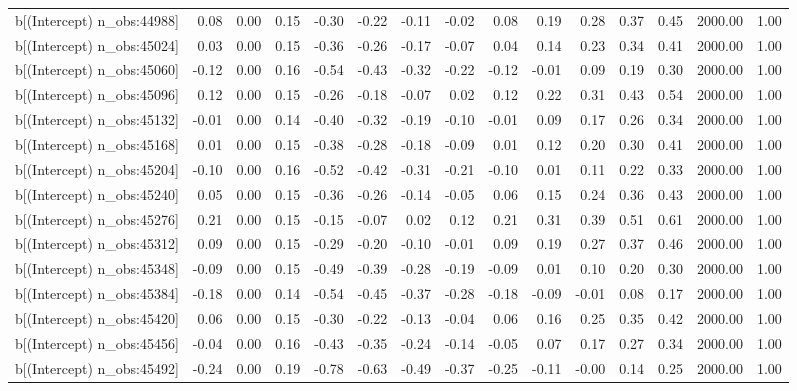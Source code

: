 \begin{table}[ht]
\begin{tabular}{rrrrrrrrrrrrrrr}
  b[(Intercept) n\_obs:44988] & 0.08 & 0.00 & 0.15 & -0.30 & -0.22 & -0.11 & -0.02 & 0.08 & 0.19 & 0.28 & 0.37 & 0.45 & 2000.00 & 1.00 \\ 
  b[(Intercept) n\_obs:45024] & 0.03 & 0.00 & 0.15 & -0.36 & -0.26 & -0.17 & -0.07 & 0.04 & 0.14 & 0.23 & 0.34 & 0.41 & 2000.00 & 1.00 \\ 
  b[(Intercept) n\_obs:45060] & -0.12 & 0.00 & 0.16 & -0.54 & -0.43 & -0.32 & -0.22 & -0.12 & -0.01 & 0.09 & 0.19 & 0.30 & 2000.00 & 1.00 \\ 
  b[(Intercept) n\_obs:45096] & 0.12 & 0.00 & 0.15 & -0.26 & -0.18 & -0.07 & 0.02 & 0.12 & 0.22 & 0.31 & 0.43 & 0.54 & 2000.00 & 1.00 \\ 
  b[(Intercept) n\_obs:45132] & -0.01 & 0.00 & 0.14 & -0.40 & -0.32 & -0.19 & -0.10 & -0.01 & 0.09 & 0.17 & 0.26 & 0.34 & 2000.00 & 1.00 \\ 
  b[(Intercept) n\_obs:45168] & 0.01 & 0.00 & 0.15 & -0.38 & -0.28 & -0.18 & -0.09 & 0.01 & 0.12 & 0.20 & 0.30 & 0.41 & 2000.00 & 1.00 \\ 
  b[(Intercept) n\_obs:45204] & -0.10 & 0.00 & 0.16 & -0.52 & -0.42 & -0.31 & -0.21 & -0.10 & 0.01 & 0.11 & 0.22 & 0.33 & 2000.00 & 1.00 \\ 
  b[(Intercept) n\_obs:45240] & 0.05 & 0.00 & 0.15 & -0.36 & -0.26 & -0.14 & -0.05 & 0.06 & 0.15 & 0.24 & 0.36 & 0.43 & 2000.00 & 1.00 \\ 
  b[(Intercept) n\_obs:45276] & 0.21 & 0.00 & 0.15 & -0.15 & -0.07 & 0.02 & 0.12 & 0.21 & 0.31 & 0.39 & 0.51 & 0.61 & 2000.00 & 1.00 \\ 
  b[(Intercept) n\_obs:45312] & 0.09 & 0.00 & 0.15 & -0.29 & -0.20 & -0.10 & -0.01 & 0.09 & 0.19 & 0.27 & 0.37 & 0.46 & 2000.00 & 1.00 \\ 
  b[(Intercept) n\_obs:45348] & -0.09 & 0.00 & 0.15 & -0.49 & -0.39 & -0.28 & -0.19 & -0.09 & 0.01 & 0.10 & 0.20 & 0.30 & 2000.00 & 1.00 \\ 
  b[(Intercept) n\_obs:45384] & -0.18 & 0.00 & 0.14 & -0.54 & -0.45 & -0.37 & -0.28 & -0.18 & -0.09 & -0.01 & 0.08 & 0.17 & 2000.00 & 1.00 \\ 
  b[(Intercept) n\_obs:45420] & 0.06 & 0.00 & 0.15 & -0.30 & -0.22 & -0.13 & -0.04 & 0.06 & 0.16 & 0.25 & 0.35 & 0.42 & 2000.00 & 1.00 \\ 
  b[(Intercept) n\_obs:45456] & -0.04 & 0.00 & 0.16 & -0.43 & -0.35 & -0.24 & -0.14 & -0.05 & 0.07 & 0.17 & 0.27 & 0.34 & 2000.00 & 1.00 \\ 
  b[(Intercept) n\_obs:45492] & -0.24 & 0.00 & 0.19 & -0.78 & -0.63 & -0.49 & -0.37 & -0.25 & -0.11 & -0.00 & 0.14 & 0.25 & 2000.00 & 1.00 \\ 

\end{tabular}
\end{table}
